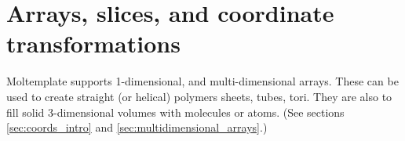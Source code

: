 \documentclass[11pt]{article}
\begin{document}







\section{Arrays, slices, and coordinate transformations}
\label{sec:arrays}
Moltemplate supports 1-dimensional, and multi-dimensional arrays.
These can be used to create straight (or helical) polymers
sheets, tubes, tori.
They are also to fill solid 3-dimensional volumes
with molecules or atoms.
(See sections \ref{sec:coords_intro} and \ref{sec:multidimensional_arrays}.)
\end{document}
